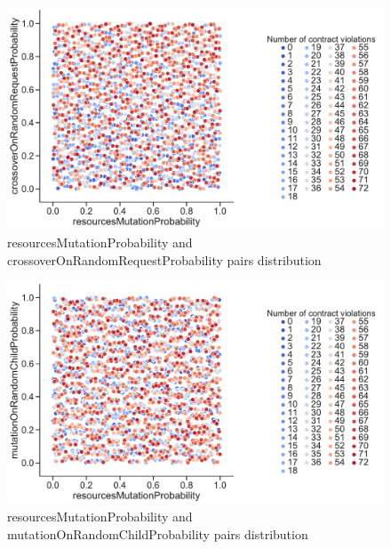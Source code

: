 \begin{figure}
	\centering
	\includegraphics[width=\textwidth]{images/PairsDistr/resourcesMutationProbability_crossoverOnRandomRequestProbability.pdf}
	\caption[resourcesMutationProbability and crossoverOnRandomRequestProbability pairs distribution]{resourcesMutationProbability and crossoverOnRandomRequestProbability pairs distribution}   
	\label{fig:resourcesMutationProbability_crossoverOnRandomRequestProbability_pair}
\end{figure}
\clearpage
\begin{figure}
	\centering
	\includegraphics[width=\textwidth]{images/PairsDistr/resourcesMutationProbability_mutationOnRandomChildProbability.pdf}
	\caption[resourcesMutationProbability and mutationOnRandomChildProbability pairs distribution]{resourcesMutationProbability and mutationOnRandomChildProbability pairs distribution}
	\label{fig:resourcesMutationProbability_mutationOnRandomChildProbability_pair}
\end{figure}
\clearpage
